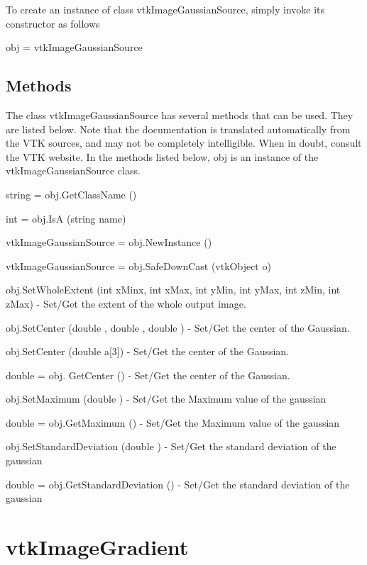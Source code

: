 To create an instance of class vtk\-Image\-Gaussian\-Source, simply invoke its constructor as follows \begin{DoxyVerb}  obj = vtkImageGaussianSource
\end{DoxyVerb}
 \hypertarget{vtkwidgets_vtkxyplotwidget_Methods}{}\subsection{Methods}\label{vtkwidgets_vtkxyplotwidget_Methods}
The class vtk\-Image\-Gaussian\-Source has several methods that can be used. They are listed below. Note that the documentation is translated automatically from the V\-T\-K sources, and may not be completely intelligible. When in doubt, consult the V\-T\-K website. In the methods listed below, {\ttfamily obj} is an instance of the vtk\-Image\-Gaussian\-Source class. 
\begin{DoxyItemize}
\item {\ttfamily string = obj.\-Get\-Class\-Name ()}  
\item {\ttfamily int = obj.\-Is\-A (string name)}  
\item {\ttfamily vtk\-Image\-Gaussian\-Source = obj.\-New\-Instance ()}  
\item {\ttfamily vtk\-Image\-Gaussian\-Source = obj.\-Safe\-Down\-Cast (vtk\-Object o)}  
\item {\ttfamily obj.\-Set\-Whole\-Extent (int x\-Minx, int x\-Max, int y\-Min, int y\-Max, int z\-Min, int z\-Max)} -\/ Set/\-Get the extent of the whole output image.  
\item {\ttfamily obj.\-Set\-Center (double , double , double )} -\/ Set/\-Get the center of the Gaussian.  
\item {\ttfamily obj.\-Set\-Center (double a\mbox{[}3\mbox{]})} -\/ Set/\-Get the center of the Gaussian.  
\item {\ttfamily double = obj. Get\-Center ()} -\/ Set/\-Get the center of the Gaussian.  
\item {\ttfamily obj.\-Set\-Maximum (double )} -\/ Set/\-Get the Maximum value of the gaussian  
\item {\ttfamily double = obj.\-Get\-Maximum ()} -\/ Set/\-Get the Maximum value of the gaussian  
\item {\ttfamily obj.\-Set\-Standard\-Deviation (double )} -\/ Set/\-Get the standard deviation of the gaussian  
\item {\ttfamily double = obj.\-Get\-Standard\-Deviation ()} -\/ Set/\-Get the standard deviation of the gaussian  
\end{DoxyItemize}\hypertarget{vtkimaging_vtkimagegradient}{}\section{vtk\-Image\-Gradient}\label{vtkimaging_vtkimagegradient}
